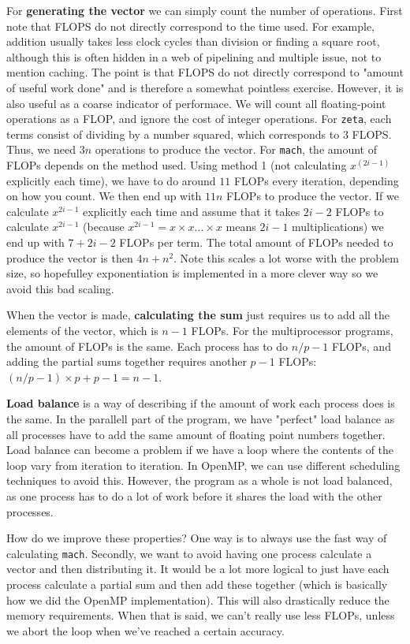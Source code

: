 \documentclass[12pt]{article}
\begin{document}
For \textbf{generating the vector} we can simply count the number of operations. First note that FLOPS do not directly correspond to the time used. 
For example, addition usually takes less clock cycles
than division or finding a square root, although this is often hidden in a web of pipelining and multiple issue, not to mention caching.
The point is that FLOPS do not directly correspond to "amount of useful work done" and is therefore a somewhat pointless exercise. However, it is also useful as a coarse indicator of performace.
We will count all floating-point operations as a FLOP, and ignore the cost of integer operations. 
For \texttt{zeta}, each terms consist of dividing by a number squared, which corresponds to $3$ FLOPS. 
Thus, we need $3n$ operations to produce the vector. For \texttt{mach}, the amount of FLOPs depends on the method used. 
Using method 1 (not calculating $x^{(2i-1)}$ explicitly each time), we have to do around $11$ FLOPs every iteration, depending on how you count. We then end up with $11n$ FLOPs to produce the vector.
If we calculate $x^{2i-1}$ explicitly each time and assume that it takes $2i-2$ FLOPs to calculate $x^{2i-1}$ (because $x^{2i-1} = x \times x ... \times x$ means $2i-1$ multiplications) we end up
with $7 + 2i - 2$ FLOPs per term. The total amount of FLOPs needed to produce the vector is then $4n + n^2$. Note this scales a lot worse with the problem size, so hopefulley exponentiation is
implemented in a more clever way so we avoid this bad scaling.

When the vector is made, \textbf{calculating the sum} just requires us to add all the elements of the vector, which is $n-1$ FLOPs. For the multiprocessor programs, the amount of FLOPs is the same.
Each process has to do $n/p - 1$ FLOPs, and adding the partial sums together requires another $p-1$ FLOPs: $(n/p - 1)\times p + p-1 = n-1$.

\textbf{Load balance} is a way of describing if the amount of work each process does is the same. In the parallell part of the program, we have "perfect" load balance as all processes have to add
the same amount of floating point numbers together. Load balance can become a problem if we have a loop where the contents of the loop vary from iteration to iteration. In OpenMP, we can use
different scheduling techniques to avoid this. However, the program as a whole is not load balanced, as one process has to do a lot of work before it shares the load with the other processes.         

How do we improve these properties? One way is to always use the fast way of calculating \texttt{mach}. Secondly, we want to avoid having one process calculate a vector and then distributing it.
It would be a lot more logical to just have each process calculate a partial sum and then add these together (which is basically how we did the OpenMP implementation).
This will also drastically reduce the memory requirements. When that is said, we can't really use less FLOPs, unless we abort the loop when we've reached a certain accuracy.
\end{document}
